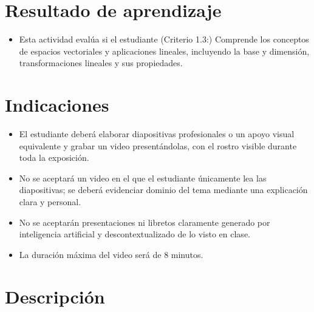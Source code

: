 \documentclass[a4,11pt]{aleph-notas}
\begin{document}
\encabezado


\section{Resultado de aprendizaje}

\begin{itemize}
\item 
    Esta actividad evalúa si el estudiante ({Criterio 1.3:})  Comprende los conceptos de espacios vectoriales y aplicaciones lineales, incluyendo la base y dimensión, transformaciones lineales y sus propiedades.
\end{itemize}

\section{Indicaciones}

\begin{itemize}
\item 
    El estudiante deberá elaborar diapositivas profesionales o un apoyo visual equivalente y grabar un video presentándolas, con el rostro visible durante toda la exposición.
\item 
    No se aceptará un video en el que el estudiante únicamente lea las diapositivas; se deberá evidenciar dominio del tema mediante una explicación clara y personal.
\item 
    No se aceptarán presentaciones ni libretos claramente generado por inteligencia artificial y descontextualizado de lo visto en clase.
\item 
    La duración máxima del video será de 8 minutos.
\end{itemize}


\section{Descripción}
\end{document}
